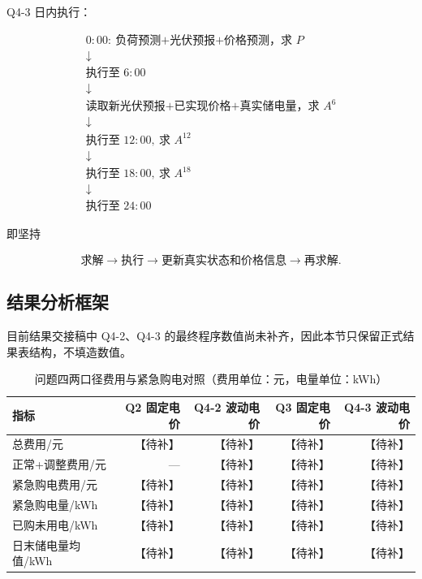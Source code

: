 Q4-3 日内执行：

\[
\boxed{
\begin{array}{c}
0{:}00:\ \text{负荷预测+光伏预报+价格预测，求 }P\\
\downarrow\\
\text{执行至 }6{:}00\\
\downarrow\\
\text{读取新光伏预报+已实现价格+真实储电量，求 }A^6\\
\downarrow\\
\text{执行至 }12{:}00,\ \text{求 }A^{12}\\
\downarrow\\
\text{执行至 }18{:}00,\ \text{求 }A^{18}\\
\downarrow\\
\text{执行至 }24{:}00
\end{array}
}
\]

即坚持

\[
\boxed{
\text{求解}
\rightarrow
\text{执行}
\rightarrow
\text{更新真实状态和价格信息}
\rightarrow
\text{再求解}
}.
\]

\subsection{结果分析框架}

目前结果交接稿中 Q4-2、Q4-3 的最终程序数值尚未补齐，因此本节只保留正式结果表结构，不填造数值。

\begin{table}[H]
\centering
{}
\begin{tabular}{lrrrr}
\toprule
指标 & Q2 固定电价 & Q4-2 波动电价 & Q3 固定电价 & Q4-3 波动电价 \\
\midrule
总费用/元 & 【待补】 & 【待补】 & 【待补】 & 【待补】 \\
正常+调整费用/元 & — & 【待补】 & 【待补】 & 【待补】 \\
紧急购电费用/元 & 【待补】 & 【待补】 & 【待补】 & 【待补】 \\
紧急购电量/kWh & 【待补】 & 【待补】 & 【待补】 & 【待补】 \\
已购未用电/kWh & 【待补】 & 【待补】 & 【待补】 & 【待补】 \\
日末储电量均值/kWh & 【待补】 & 【待补】 & 【待补】 & 【待补】 \\
\bottomrule
\end{tabular}
\caption{问题四两口径费用与紧急购电对照（费用单位：元，电量单位：kWh）}
\label{tab:11}
\end{table}

